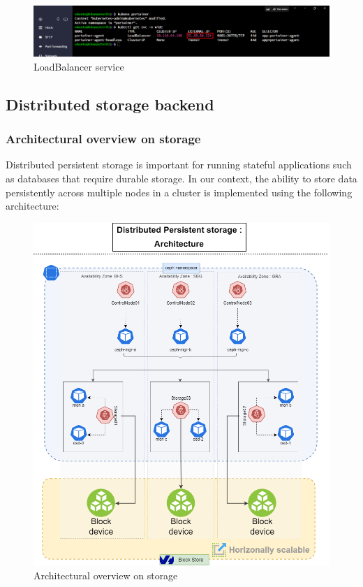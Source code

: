 \begin{enumerate}[label = (\alph*)]
\begin{itemize}[label={--}]
        \begin{figure}[H]\centering
        \includegraphics[width=1.0\textwidth,angle=00]{assets/f23.png}
        \caption{LoadBalancer service }
        \label{fig:LoadBalancer}
        \end{figure}
        
    \end{itemize}

\end{enumerate}

\subsection{Distributed storage backend}

\subsubsection{Architectural overview on storage}

Distributed persistent storage is important for running stateful applications such as databases that require durable storage. In our context, the ability to store data persistently across multiple nodes in a cluster is implemented using the following architecture: 

\begin{figure}[H]\centering
\includegraphics[width=1.0\textwidth,angle=00]{assets/f26.png}
\caption{Architectural overview on storage}
\label{fig:Architectural overview on storage}
\end{figure}

